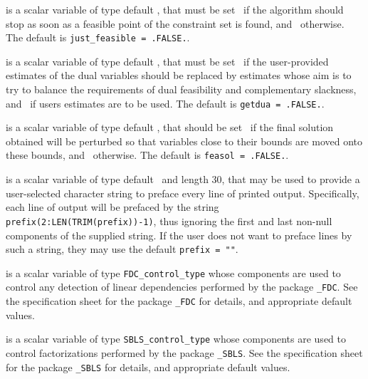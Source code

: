 \documentclass{galahad}
\begin{document}
\begin{description}
 is a scalar variable of type default \logical, that 
must be set \true\ if the algorithm should stop as soon as a feasible point
of the constraint set is found, and \false\ otherwise. 
The default is {\tt just\_feasible = .FALSE.}.

 is a scalar variable of type default \logical, that 
must be set \true\ if the user-provided estimates of the dual variables
should be replaced by estimates whose aim is to try to balance the
requirements of dual feasibility and complementary slackness,
and \false\ if users estimates are to be used.
The default is {\tt getdua = .FALSE.}.

 is a scalar variable of type default \logical, that 
should be set \true\ 
if the final solution obtained will be perturbed 
so that variables close to their bounds are moved onto these bounds,
and \false\ otherwise. 
The default is {\tt feasol = .FALSE.}.


 is a scalar variable of type default \character\
and length 30, that may be used to provide a user-selected 
character string to preface every line of printed output. 
Specifically, each line of output will be prefaced by the string 
{\tt prefix(2:LEN(TRIM(prefix))-1)},
thus ignoring the first and last non-null components of the
supplied string. If the user does not want to preface lines by such
a string, they may use the default {\tt prefix = ""}.

 is a scalar variable of type 
{\tt FDC\_control\_type}
whose components are used to control any detection of linear dependencies
performed by the package 
{\tt \libraryname\_FDC}. 
See the specification sheet for the package 
{\tt \libraryname\_FDC} 
for details, and appropriate default values.

 is a scalar variable of type 
{\tt SBLS\_control\_type}
whose components are used to control factorizations
performed by the package 
{\tt \libraryname\_SBLS}. 
See the specification sheet for the package 
{\tt \libraryname\_SBLS} 
for details, and appropriate default values.

\end{description}
\end{document}
